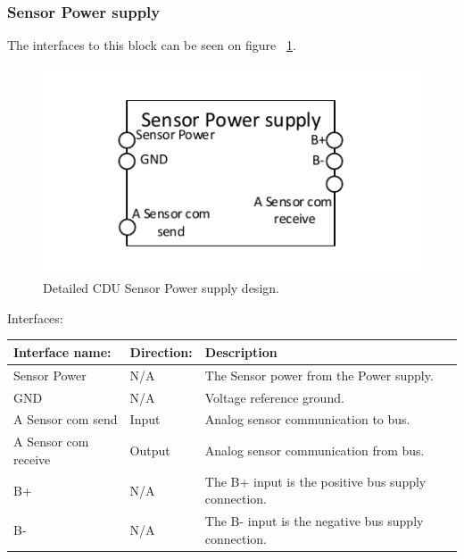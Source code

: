 \subsubsection{Sensor Power supply}
The interfaces to this block can be seen on figure ~\ref{fig:CDUSPS}.\\
\begin{figure}[H]
	\centering
	\includegraphics[scale=1]{billeder/CDUSPS}
	\caption{Detailed CDU Sensor Power supply design.}
	\label{fig:CDUSPS}
\end{figure}
Interfaces:
\begin{table}[H]
	\centering
	\begin{tabular}{|p{3cm} |p{3cm} | p{8cm}| }
		\hline
		Interface name: 	&Direction: & Description \\ \hline
		Sensor Power	 &N/A & The Sensor power from the Power supply. \\ \hline
		GND				&N/A & Voltage reference ground. \\\hline 
		A Sensor com send	&Input & Analog sensor communication to bus. \\\hline 
		A Sensor com receive	&Output & Analog sensor communication from bus. \\\hline
		B+ 				&N/A & The B+ input is the positive bus supply connection. \\ \hline
		B- 				&N/A & The B- input is the negative bus supply connection. \\ \hline
	\end{tabular}
\end{table}

